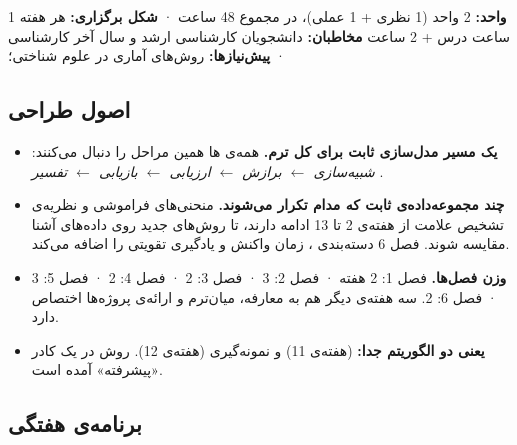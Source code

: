 \textbf{واحد:} 2 واحد (1 نظری + 1 عملی)، در مجموع 48 ساعت · \textbf{شکل
برگزاری:} هر هفته 1 ساعت درس + 2 ساعت  \textbf{مخاطبان:}
دانشجویان کارشناسی ارشد و سال آخر کارشناسی · \textbf{پیش‌نیازها:} روش‌های
آماری در علوم شناختی؛

\subsection{اصول طراحی}

\begin{itemize}
\tightlist
\item
  \textbf{یک مسیر مدل‌سازی ثابت برای کل ترم.} همه‌ی ها همین مراحل
  را دنبال می‌کنند: \emph{شبیه‌سازی  \ensuremath{\leftarrow} برازش  \ensuremath{\leftarrow}
  ارزیابی  \ensuremath{\leftarrow} بازیابی  \ensuremath{\leftarrow} تفسیر
  }.
\item
  \textbf{چند مجموعه‌داده‌ی ثابت که مدام تکرار می‌شوند.} منحنی‌های فراموشی و
  نظریه‌ی تشخیص علامت  از هفته‌ی 2 تا 13 ادامه دارند، تا روش‌های
  جدید روی داده‌های آشنا مقایسه شوند. فصل 6 دسته‌بندی ، زمان
  واکنش  و یادگیری تقویتی  را اضافه می‌کند.
\item
  \textbf{وزن فصل‌ها.} فصل 1: 2 هفته · فصل 2: 3 · فصل 3: 2 · فصل 4: 2 ·
  فصل 5: 3 · فصل 6: 2. سه هفته‌ی دیگر هم به معارفه، میان‌ترم و ارائه‌ی
  پروژه‌ها اختصاص دارد.
\item
  \textbf{ یعنی دو الگوریتم جدا:}
   (هفته‌ی 11) و نمونه‌گیری  (هفته‌ی
  12). روش  در یک کادر «پیشرفته» آمده است.
\end{itemize}

\subsection{برنامه‌ی هفتگی}

